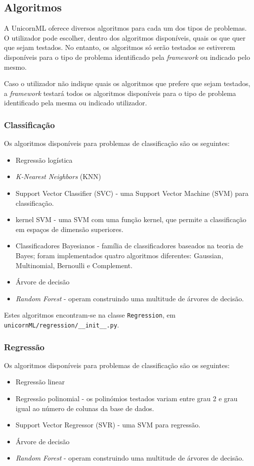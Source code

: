 \documentclass[a4paper]{report}
\begin{document}
{		\subsection{Algoritmos} \label{subsec:A-2}
		A UnicornML oferece diversos algoritmos para cada um dos tipos de problemas. 
		O utilizador pode escolher, dentro dos algoritmos disponíveis, quais os que quer que sejam testados. 
		No entanto, os algoritmos só serão testados se estiverem disponíveis para o tipo de problema identificado pela \textit{framework} ou indicado pelo mesmo.

		Caso o utilizador não indique quais os algoritmos que prefere que sejam testados, a \textit{framework} testará todos os algoritmos disponíveis para o tipo de problema identificado pela mesma ou indicado utilizador.
            
			\subsubsection{Classificação} \label{sssec:A-2-1}
			Os algoritmos disponíveis para problemas de classificação são os seguintes:
			\begin{itemize}
				\item Regressão logística
				\item \textit{K-Nearest Neighbors} (KNN)
				\item Support Vector Classifier (SVC) - uma Support Vector Machine (SVM) para classificação.
				\item kernel SVM - uma SVM com uma função kernel, que permite a classificação em espaços de dimensão superiores.
				\item Classificadores Bayesianos - família de classificadores baseados na teoria de Bayes; foram implementados quatro algoritmos diferentes: Gaussian, Multinomial, Bernoulli e Complement.
				\item Árvore de decisão
				\item \textit{Random Forest} - operam construindo uma multitude de árvores de decisão.
			\end{itemize}

			Estes algoritmos encontram-se na classe \texttt{Regression}, em \texttt{unicornML/regression/\_\_init\_\_.py}.
            
			\subsubsection{Regressão} \label{sssec:A-2-2}
			Os algoritmos disponíveis para problemas de classificação são os seguintes:
			\begin{itemize}
				\item Regressão linear
				\item Regressão polinomial - os polinómios testados variam entre grau 2 e grau igual ao número de colunas da base de dados.
				\item Support Vector Regressor (SVR) - uma SVM para regressão.
				\item Árvore de decisão
				\item \textit{Random Forest} - operam construindo uma multitude de árvores de decisão.
			\end{itemize}

}
\end{document}
